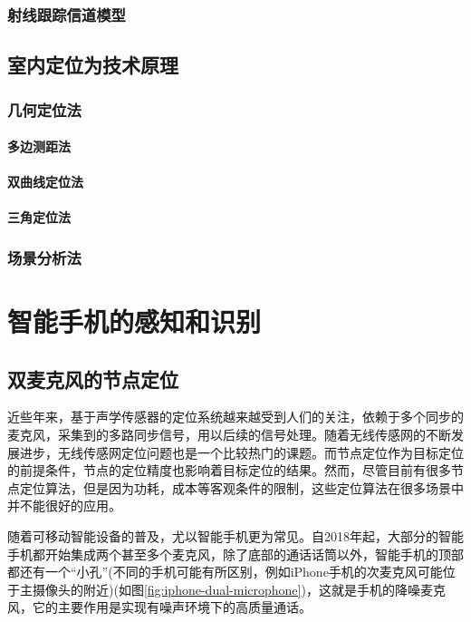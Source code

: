 \documentclass[winfonts]{njuthesis}
\begin{document}
		
		
		\subsection{射线跟踪信道模型}
	
	\section{室内定位为技术原理}
		\subsection{几何定位法}
			\subsubsection{多边测距法}
			
			
			\subsubsection{双曲线定位法}
			
			
			
			\subsubsection{三角定位法}
		\subsection{场景分析法}

\chapter{智能手机的感知和识别}\label{chapter_mobile}
	\section{双麦克风的节点定位}
		
		近些年来，基于声学传感器的定位系统越来越受到人们的关注，依赖于多个同步的麦克风，采集到的多路同步信号，用以后续的信号处理。随着无线传感网的不断发展进步，无线传感网定位问题也是一个比较热门的课题。而节点定位作为目标定位的前提条件，节点的定位精度也影响着目标定位的结果。然而，尽管目前有很多节点定位算法，但是因为功耗，成本等客观条件的限制，这些定位算法在很多场景中并不能很好的应用。
		
		随着可移动智能设备的普及，尤以智能手机更为常见。自2018年起，大部分的智能手机都开始集成两个甚至多个麦克风，除了底部的通话话筒以外，智能手机的顶部都还有一个“小孔”(不同的手机可能有所区别，例如iPhone手机的次麦克风可能位于主摄像头的附近)(如图\ref{fig:iphone-dual-microphone})，这就是手机的降噪麦克风，它的主要作用是实现有噪声环境下的高质量通话。
		
\end{document}

